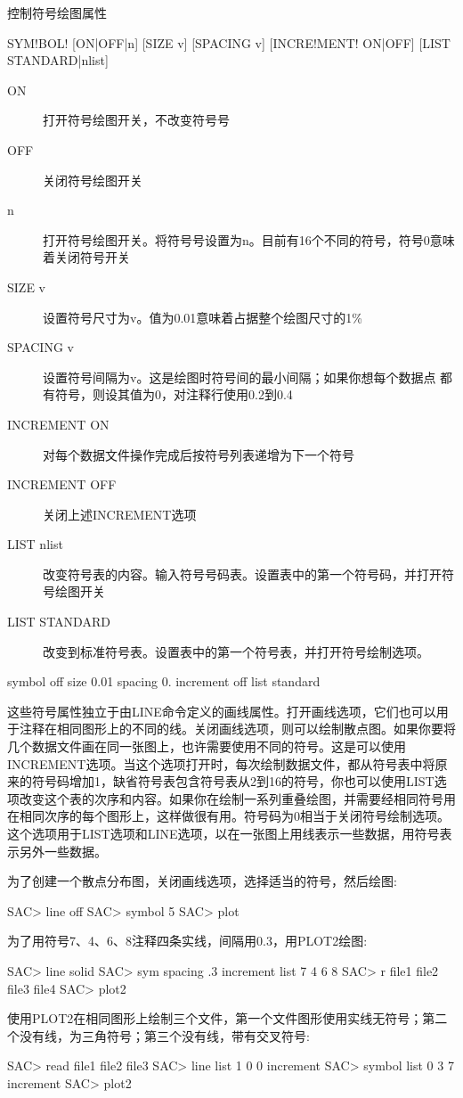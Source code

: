 \label{cmd:symbol}

控制符号绘图属性

\begin{SACSTX}
SYM!BOL! [ON|OFF|n] [SIZE v] [SPACING v] [INCRE!MENT! ON|OFF]
    [LIST STANDARD|nlist]
\end{SACSTX}

\begin{description}
\item [ON] 打开符号绘图开关，不改变符号号
\item [OFF] 关闭符号绘图开关
\item [n] 打开符号绘图开关。将符号号设置为n。目前有16个不同的符号，符号0意味着关闭符号开关
\item [SIZE v] 设置符号尺寸为v。值为0.01意味着占据整个绘图尺寸的1\%
\item [SPACING v] 设置符号间隔为v。这是绘图时符号间的最小间隔；如果你想每个数据点
    都有符号，则设其值为0，对注释行使用0.2到0.4
\item [INCREMENT ON] 对每个数据文件操作完成后按符号列表递增为下一个符号
\item [INCREMENT OFF] 关闭上述INCREMENT选项
\item [LIST nlist] 改变符号表的内容。输入符号号码表。设置表中的第一个符号码，并打开符号绘图开关
\item [LIST STANDARD] 改变到标准符号表。设置表中的第一个符号表，并打开符号绘制选项。
\end{description}

\begin{SACDFT}
symbol off size 0.01 spacing 0. increment off list standard
\end{SACDFT}

这些符号属性独立于由LINE命令定义的画线属性。打开画线选项，它们也可以用于注释在相同图形上的不同的线。关闭画线选项，则可以绘制散点图。如果你要将几个数据文件画在同一张图上，也许需要使用不同的符号。这是可以使用INCREMENT选项。当这个选项打开时，每次绘制数据文件，都从符号表中将原来的符号码增加1，缺省符号表包含符号表从2到16的符号，你也可以使用LIST选项改变这个表的次序和内容。如果你在绘制一系列重叠绘图，并需要经相同符号用在相同次序的每个图形上，这样做很有用。符号码为0相当于关闭符号绘制选项。这个选项用于LIST选项和LINE选项，以在一张图上用线表示一些数据，用符号表示另外一些数据。

为了创建一个散点分布图，关闭画线选项，选择适当的符号，然后绘图:
\begin{SACCode}
SAC> line off
SAC> symbol 5
SAC> plot
\end{SACCode}

为了用符号7、4、6、8注释四条实线，间隔用0.3，用PLOT2绘图:
\begin{SACCode}
SAC> line solid
SAC> sym spacing .3 increment list 7 4 6 8
SAC> r file1 file2 file3 file4
SAC> plot2
\end{SACCode}

使用PLOT2在相同图形上绘制三个文件，第一个文件图形使用实线无符号；第二个没有线，为三角符号；第三个没有线，带有交叉符号:
\begin{SACCode}
SAC> read file1 file2 file3
SAC> line list 1 0 0 increment
SAC> symbol list 0 3 7 increment
SAC> plot2
\end{SACCode}
